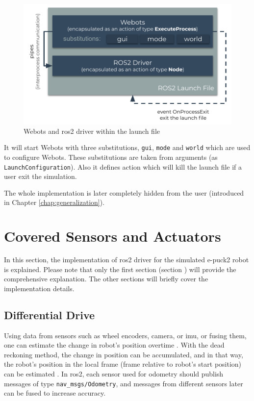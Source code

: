 \begin{figure}[H]
    \centering
    \includegraphics[width=\textwidth]{simulation/figures/webots_launch.pdf}
    \caption{Webots and \ac{ros2} driver within the launch file}
    \label{fig:simulation:webots_launch}
\end{figure}

It will start Webots with three substitutions, \texttt{gui}, \texttt{mode} and \texttt{world} which are used to configure Webots.
These substitutions are taken from arguments (as \texttt{LaunchConfiguration}).
Also it defines action which will kill the launch file if a user exit the simulation.

The whole implementation is later completely hidden from the user (introduced in Chapter \ref{chap:generalization}).


\section{Covered Sensors and Actuators}

In this section, the implementation of \ac{ros2} driver for the simulated e-puck2 robot is explained.
Please note that only the first section (section \label{sec:simulation:odometry_velocity}) will provide the comprehensive explanation.
The other sections will briefly cover the implementation details. 

\subsection{Differential Drive}
\label{sec:simulation:odometry_velocity}

Using data from sensors such as wheel encoders, camera, or \ac{imu}, or fusing them, one can estimate the change in robot's position overtime \cite{shen_localization_2011, nister_visual_2004}.
With the dead reckoning method, the change in position can be accumulated, and in that way, the robot's position in the local frame (frame relative to robot's start position) can be estimated \cite{ben-ari_elements_2018, astolfi_exponential_1999}.
In \ac{ros2}, each sensor used for odometry should publish messages of type \texttt{nav\_msgs/Odometry}, and messages from different sensors later can be fused to increase accuracy. 


